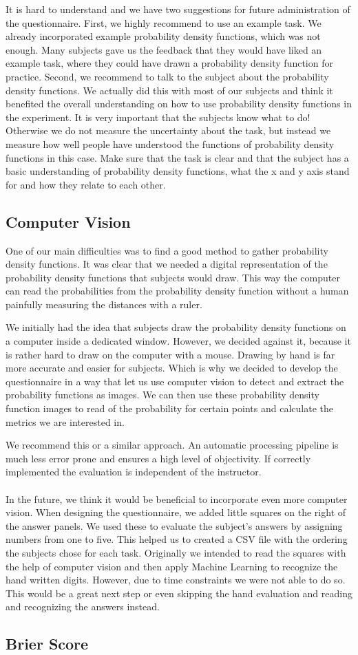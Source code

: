 \documentclass[../main/main.tex]{subfiles}
\begin{document}
	It is hard to understand and we have two suggestions for future administration of the questionnaire. First, we highly recommend to use an example task. We already incorporated example probability density functions, which was not enough. Many subjects gave us the feedback that they would have liked an example task, where they could have drawn a probability density function for practice. Second, we recommend to talk to the subject about the probability density functions. We actually did this with most of our subjects and think it benefited the overall understanding on how to use probability density functions in the experiment. It is very important that the subjects know what to do! Otherwise we do not measure the uncertainty about the task, but instead we measure how well people have understood the functions of probability density functions in this case. Make sure that the task is clear and that the subject has a basic understanding of probability density functions, what the x and y axis stand for and how they relate to each other.
	
	\subsection{Computer Vision}
	
	One of our main difficulties was to find a good method to gather probability density functions. It was clear that we needed a digital representation of the probability density functions that subjects would draw. This way the computer can read the probabilities from the probability density function without a human painfully measuring the distances with a ruler.
	
	We initially had the idea that subjects draw the probability density functions on a computer inside a dedicated window. However, we decided against it, because it is rather hard to draw on the computer with a mouse. Drawing by hand is far more accurate and easier for subjects. Which is why we decided to develop the questionnaire in a way that let us use computer vision to detect and extract the probability functions as images. We can then use these probability density function images to read of the probability for certain points and calculate the metrics we are interested in.
	
	We recommend this or a similar approach. An automatic processing pipeline is much less error prone and ensures a high level of objectivity. If correctly implemented the evaluation is independent of the instructor. 
	\\\\
	In the future, we think it would be beneficial to incorporate even more computer vision. When designing the questionnaire, we added little squares on the right of the answer panels. We used these to evaluate the subject's answers by assigning numbers from one to five. This helped us to created a CSV file with the ordering the subjects chose for each task. Originally we intended to read the squares with the help of computer vision and then apply Machine Learning to recognize the hand written digits. However, due to time constraints we were not able to do so. This would be a great next step or even skipping the hand evaluation and reading and recognizing the answers instead.
	
	\subsection{Brier Score}
	
	
\end{document}
